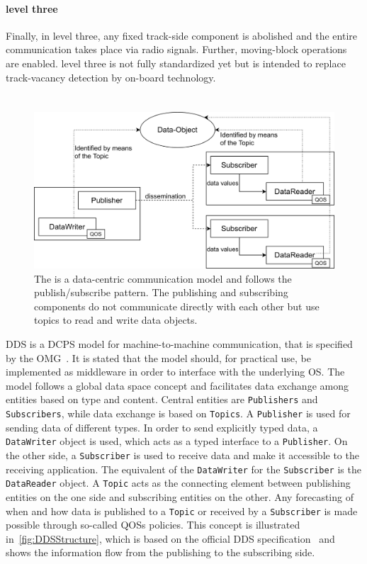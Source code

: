 \paragraph{ level three}
Finally, in  level three, any fixed track-side component is abolished and the entire communication takes place via radio signals.
Further, moving-block operations are enabled.
 level three is not fully standardized yet but is intended to replace track-vacancy detection by on-board technology.

\section{}

\begin{figure}[!hb]
	\centering
	\includegraphics[width=0.8\linewidth]{images/DDSStructure}
	\caption{The  is a data-centric communication model and follows the publish/subscribe pattern. The publishing and subscribing components do not communicate directly with each other but use topics to read and write data objects.}
	\label{fig:DDSStructure}
\end{figure}

\Gls*{DDS} is a \gls*{DCPS} model for machine-to-machine communication, that is specified by the \gls*{OMG}~\cite{omgDDSspec}.
It is stated that the model should, for practical use, be implemented as middleware in order to interface with the underlying \gls*{OS}.
The model follows a global data space concept and facilitates data exchange among entities based on type and content.
Central entities are \texttt{Publishers} and \texttt{Subscribers}, while data exchange is based on \texttt{Topics}.
A \texttt{Publisher} is used for sending data of different types.
In order to send explicitly typed data, a \texttt{DataWriter} object is used, which acts as a typed interface to a \texttt{Publisher}.
On the other side, a \texttt{Subscriber} is used to receive data and make it accessible to the receiving application.
The equivalent of the \texttt{DataWriter} for the \texttt{Subscriber} is the \texttt{DataReader} object.
A \texttt{Topic} acts as the connecting element between publishing entities on the one side and subscribing entities on the other.
Any forecasting of when and how data is published to a \texttt{Topic} or received by a \texttt{Subscriber} is made possible through so-called \glspl*{QOS} policies.
This concept is illustrated in~\autoref{fig:DDSStructure}, which is based on the official \gls*{DDS} specification~\cite{omgDDSspec} and shows the information flow from the publishing to the subscribing side.

